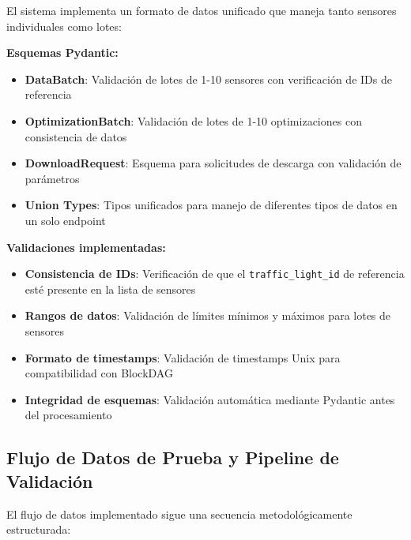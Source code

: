 \documentclass[onecolumn]{article}
\begin{document}
El sistema implementa un formato de datos unificado que maneja tanto sensores individuales como lotes:

\textbf{Esquemas Pydantic:}
\begin{itemize}
    \item \textbf{DataBatch}: Validación de lotes de 1-10 sensores con verificación de IDs de referencia
    \item \textbf{OptimizationBatch}: Validación de lotes de 1-10 optimizaciones con consistencia de datos
    \item \textbf{DownloadRequest}: Esquema para solicitudes de descarga con validación de parámetros
    \item \textbf{Union Types}: Tipos unificados para manejo de diferentes tipos de datos en un solo endpoint
\end{itemize}

\textbf{Validaciones implementadas:}
\begin{itemize}
    \item \textbf{Consistencia de IDs}: Verificación de que el \texttt{traffic\_light\_id} de referencia esté presente en la lista de sensores
    \item \textbf{Rangos de datos}: Validación de límites mínimos y máximos para lotes de sensores
    \item \textbf{Formato de timestamps}: Validación de timestamps Unix para compatibilidad con BlockDAG
    \item \textbf{Integridad de esquemas}: Validación automática mediante Pydantic antes del procesamiento
\end{itemize}

\subsection{Flujo de Datos de Prueba y Pipeline de Validación}

El flujo de datos implementado sigue una secuencia metodológicamente estructurada:
\end{document}
